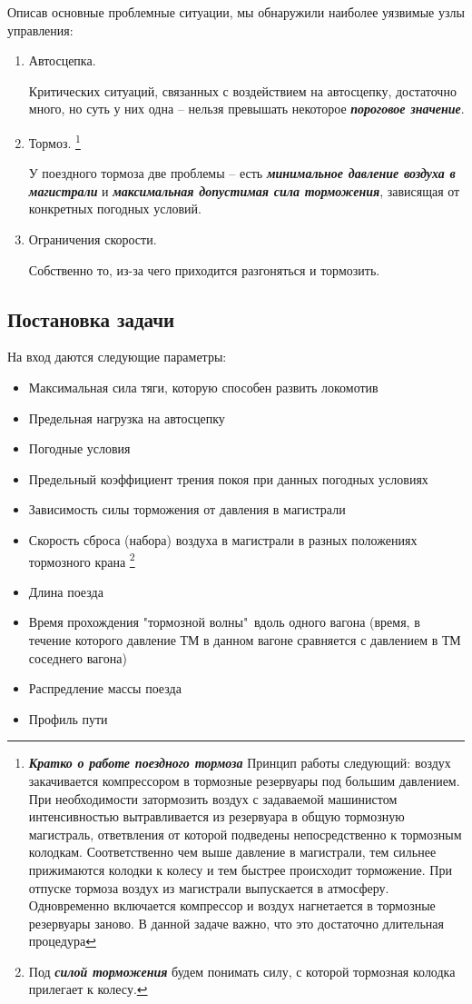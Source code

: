 Описав основные проблемные ситуации, мы обнаружили наиболее уязвимые узлы управления:
\begin{enumerate}
\item Автосцепка.

Критических ситуаций, связанных с воздействием на автосцепку, достаточно много, но суть у них одна -- нельзя превышать некоторое \textbf{\textit{пороговое значение}}.

\item Тормоз.
\footnote{\textbf{\textit{Кратко о работе поездного тормоза}} Принцип работы следующий: воздух закачивается компрессором в тормозные резервуары под большим давлением. При необходимости затормозить воздух с задаваемой машинистом интенсивностью вытравливается из резервуара в общую тормозную магистраль, ответвления от которой подведены непосредственно к тормозным колодкам. Соответственно чем выше давление в магистрали, тем сильнее прижимаются колодки к колесу и тем быстрее происходит торможение. При отпуске тормоза воздух из магистрали выпускается в атмосферу. Одновременно включается компрессор и воздух нагнетается в тормозные резервуары заново. В данной задаче важно, что это достаточно длительная процедура}

У поездного тормоза две проблемы -- есть \textbf{\textit{минимальное давление воздуха в магистрали}} и \textbf{\textit{максимальная допустимая сила торможения}}, зависящая от конкретных погодных условий.

\item Ограничения скорости. 

Собственно то, из-за чего приходится разгоняться и тормозить.

\end{enumerate}
\subsection{Постановка задачи}
На вход даются следующие параметры:
\begin{itemize}
\item Максимальная сила тяги, которую способен развить локомотив
\item Предельная нагрузка на автосцепку
\item Погодные условия
\item Предельный коэффициент трения покоя при данных погодных условиях
\item Зависимость силы торможения от давления в магистрали
\item Скорость сброса (набора) воздуха в магистрали в разных положениях тормозного крана
\footnote{Под \textbf{\textit{силой торможения}} будем понимать силу, с которой тормозная колодка прилегает к колесу.}
\item Длина поезда
\item Время прохождения "тормозной волны"\ вдоль одного вагона (время, в течение которого давление ТМ в данном вагоне сравняется с давлением в ТМ соседнего вагона)
\item Распредление массы поезда
\item Профиль пути
\end{itemize}

